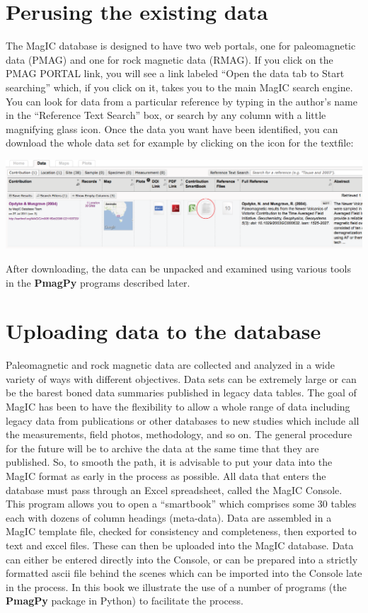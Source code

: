 \documentclass[11pt]{book}
\begin{document}
{{{\section {Perusing the existing data}

The MagIC database is designed to have two web portals, one for paleomagnetic data (PMAG) and one for rock magnetic data (RMAG).  If you click on the PMAG PORTAL link,  you will see a link labeled ``Open the data tab to Start searching'' which, if you click on it, takes you to the main MagIC search engine.  You can look for data from a particular reference by typing in the author's name in the ``Reference Text Search'' box, or search by any column with a little magnifying glass icon.   
  Once the data you want have been identified, you can download the whole data set for example by clicking on the
  icon for the textfile:
  
    \includegraphics[width=10 in]{EPSfiles/MagIC_search.eps}
  
  
       After downloading, the data can be unpacked and examined using various tools in the {\bf PmagPy}  programs described later.   

\section{Uploading data to the database}

Paleomagnetic and rock magnetic data are collected and analyzed in a wide variety of ways with different objectives.  Data sets can be extremely large or can be the barest boned data summaries published in legacy data tables.   The goal of MagIC has been to have the flexibility to allow a whole range of data including legacy data from publications or other databases to new studies which include all the measurements, field photos, methodology, and so on.  The general procedure for the future will be to archive the data at the same time that they are published.    So, to smooth the path, it is advisable to put your data into the MagIC format as early in the process as possible.  All data that enters the database must pass through    an Excel spreadsheet, called the MagIC Console.  This program allows you to open a ``smartbook''  which comprises some 30 tables each with dozens of column headings (meta-data).      Data are assembled in  a MagIC template file, checked for consistency and completeness, then exported to text and excel files.  These can then be uploaded into the MagIC database.   Data can either be entered directly into the Console, or can be prepared into a strictly formatted ascii file behind the scenes which can be imported into the Console late in the process. In this book we illustrate the use of  a number of programs (the {\bf PmagPy}  package in Python) to facilitate the process.      


}}}
\end{document}
